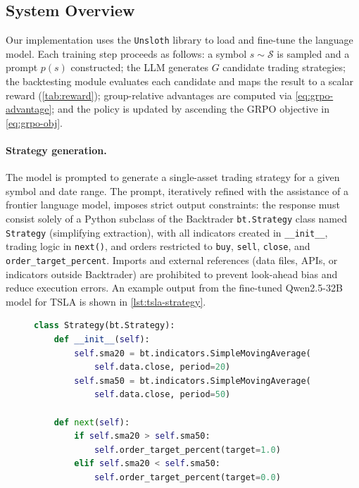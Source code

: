 \documentclass[conference,a4paper]{IEEEtran}
\begin{document}
\subsection{System Overview}
\label{sec:system}

Our implementation uses the \texttt{Unsloth} library \cite{unsloth2024} to load and
fine-tune the language model. Each training step proceeds as follows: a symbol
$s \sim \mathcal{S}$ is sampled and a prompt $p(s)$ constructed; the LLM generates $G$
candidate trading strategies; the backtesting module evaluates each candidate and maps the
result to a scalar reward (\cref{tab:reward}); group-relative advantages are computed via
\cref{eq:grpo-advantage}; and the policy is updated by ascending the GRPO objective in
\cref{eq:grpo-obj}.

\paragraph{Strategy generation.}
The model is prompted to generate a single-asset trading strategy for a given symbol and
date range. The prompt, iteratively refined with the assistance of a frontier language
model, imposes strict output constraints: the response must consist solely of a Python
subclass of the Backtrader \texttt{bt.Strategy} class named \texttt{Strategy} (simplifying
extraction), with all indicators created in \texttt{\_\_init\_\_}, trading logic in
\texttt{next()}, and orders restricted to \texttt{buy}, \texttt{sell}, \texttt{close}, and
\texttt{order\_target\_percent}. Imports and external references (data files, APIs, or
indicators outside Backtrader) are prohibited to prevent look-ahead bias and reduce
execution errors. An example output
from the fine-tuned Qwen2.5-32B model for TSLA is shown in \cref{lst:tsla-strategy}.

\begin{figure}[t]
\begin{lstlisting}[language=Python,
                   caption={Example strategy generated by Qwen2.5-32B (fine-tuned) for TSLA.},
                   label={lst:tsla-strategy},
                   basicstyle=\ttfamily\footnotesize]
class Strategy(bt.Strategy):
    def __init__(self):
        self.sma20 = bt.indicators.SimpleMovingAverage(
            self.data.close, period=20)
        self.sma50 = bt.indicators.SimpleMovingAverage(
            self.data.close, period=50)

    def next(self):
        if self.sma20 > self.sma50:
            self.order_target_percent(target=1.0)
        elif self.sma20 < self.sma50:
            self.order_target_percent(target=0.0)
\end{lstlisting}
\end{figure}
\end{document}
